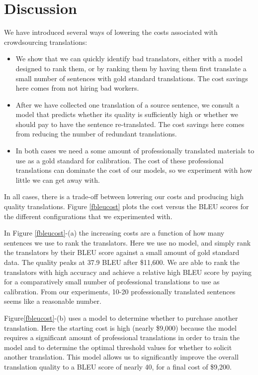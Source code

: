 \documentclass[11pt]{article}
\begin{document}
\section{Discussion}

We have introduced several ways of lowering the costs associated with crowdsourcing translations:
\begin{itemize}
\item We show that we can quickly identify bad translators, either with a model designed to rank them, or by ranking them by having them first translate a small number of sentences with gold standard translations. The cost savings here comes from not hiring bad workers.
\item After we have collected one translation of a source sentence, we consult a model that predicts whether its quality is sufficiently high or whether we should pay to have the sentence re-translated.  The cost savings here comes from reducing the number of redundant translations.
\item In both cases we need a some amount of professionally translated materials  to use as a gold standard for calibration.  The cost of these professional translations can dominate the cost of our models, so we experiment with how little we can get away with.
\end{itemize}
In all cases, there is a trade-off between lowering our costs and producing high quality translations.  Figure \ref{fbleucost} plots the cost versus the BLEU scores for the different configurations that we experimented with.

In Figure \ref{fbleucost}-(a) the increasing costs are a function of how many sentences we use to rank the translators.  Here we use no model, and simply rank the translators by their BLEU score against a small amount of gold standard data. The quality peaks at 37.9 BLEU after \$11,600.
We are able to rank the translators with high accuracy and achieve a relative high BLEU score by paying for a comparatively small number of professional translations to use as calibration.   From our experiments,  10-20 professionally translated sentences seems like a reasonable number. 

Figure\ref{fbleucost}-(b) uses a model to determine whether to purchase another translation.  Here the starting cost is high (nearly \$9,000) because the model requires a significant amount of professional translations in order to train the model and to determine the optimal threshold values for whether to solicit another translation. This model allows us to significantly improve the overall translation quality to a BLEU score of nearly 40, for a final cost of \$9,200.
\end{document}
